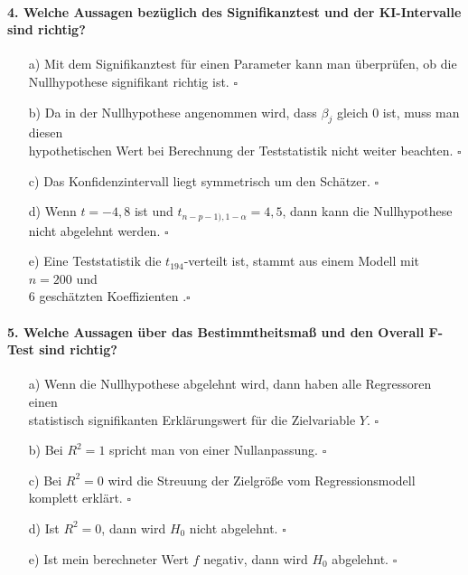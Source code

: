 \documentclass[a4paper]{article}
\begin{document}
\paragraph{4. Welche Aussagen bezüglich des Signifikanztest und der KI-Intervalle sind richtig?}
\begin{itemize}
    \item[a)] Mit dem Signifikanztest für einen Parameter kann man überprüfen, ob die\\ Nullhypothese signifikant richtig ist. \hfill $\square$
    \item[b)] Da in der Nullhypothese angenommen wird, dass $\beta_j$ gleich 0 ist, muss man diesen\\ hypothetischen Wert bei Berechnung der Teststatistik nicht weiter beachten. \hfill $\square$
    \item[c)] Das Konfidenzintervall liegt symmetrisch um den Schätzer. \hfill $\square$
    \item[d)] Wenn $t = -4,8$ ist und $t_{n-p-1),1-\alpha} = 4,5$, dann kann die Nullhypothese\\nicht abgelehnt werden. \hfill $\square$
    \item[e)] Eine Teststatistik die $t_{194}$-verteilt ist, stammt aus einem Modell mit $n = 200$ und\\6 geschätzten Koeffizienten .\hfill $\square$
\end{itemize}

\paragraph{5. Welche Aussagen über das Bestimmtheitsmaß und den Overall F-Test sind richtig?}
\begin{itemize}
    \item[a)] Wenn die Nullhypothese abgelehnt wird, dann haben alle Regressoren einen\\ statistisch signifikanten Erklärungswert für die Zielvariable $Y$. \hfill $\square$
    \item[b)] Bei $R^2=1$ spricht man von einer Nullanpassung. \hfill $\square$
    \item[c)] Bei $R^2=0$ wird die Streuung der Zielgröße vom Regressionsmodell komplett erklärt. \hfill $\square$
    \item[d)] Ist $R^2=0$, dann wird $H_0$ nicht abgelehnt. \hfill $\square$
    \item[e)] Ist mein berechneter Wert $f$ negativ, dann wird $H_0$ abgelehnt. \hfill $\square$
\end{itemize}
\end{document}
